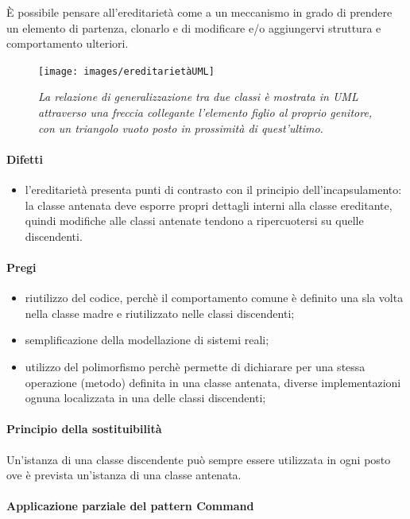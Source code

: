 È possibile pensare all'ereditarietà come a un meccanismo in grado di prendere un elemento di partenza, clonarlo e di modificare e/o aggiungervi struttura e comportamento ulteriori.

\begin{figure}[H]
\texttt{[image: images/ereditarietàUML]}
\caption{\textit{La relazione di generalizzazione tra due classi è mostrata in UML attraverso una freccia collegante l'elemento figlio al proprio genitore, con un triangolo vuoto posto in prossimità di quest'ultimo.} \label{fig:oggetto}}
\end{figure}

\paragraph{Difetti}
\begin{itemize}
\item l’ereditarietà presenta punti di contrasto con il principio dell’incapsulamento: la classe antenata deve esporre propri dettagli interni alla classe ereditante, quindi modifiche alle classi antenate tendono a ripercuotersi su quelle discendenti.
\end{itemize}

\paragraph{Pregi}
\begin{itemize}
\item riutilizzo del codice, perchè il comportamento comune è definito una sla volta nella classe madre e riutilizzato nelle classi discendenti;
\item semplificazione della modellazione di sistemi reali;
\item utilizzo del polimorfismo perchè permette di dichiarare per una stessa operazione (metodo) definita in una classe antenata, diverse implementazioni ognuna localizzata in una delle classi discendenti;
\end{itemize}

\paragraph{Principio della sostituibilità}
Un’istanza di una classe discendente può sempre essere utilizzata in ogni posto ove è prevista un’istanza di una classe antenata.

\paragraph{Applicazione parziale del pattern Command}

